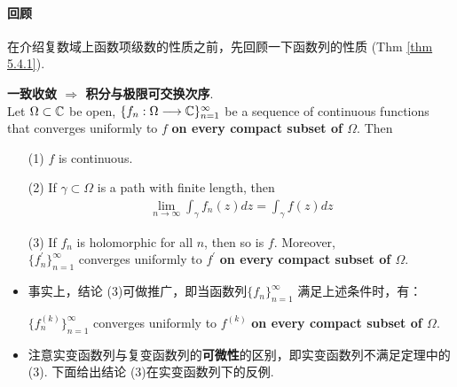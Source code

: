 \paragraph{回顾}
	在介绍复数域上函数项级数的性质之前，先回顾一下函数列的性质 (Thm \ref{thm 5.4.1}).
	\begin{thm}\label{thm 6.2.1}
		\textbf{一致收敛 $\Rightarrow$ 积分与极限可交换次序}.\\
		Let $\Omega \subset \mathbb{C}$ be open, $\{ f_n : \Omega \longrightarrow \mathbb{C} \}_{n = 1}^{\infty}$ be a sequence of continuous functions that converges uniformly to $f$ \textbf{on every compact subset of $\Omega$}. Then
		\begin{enumerate}
			\item[(1)]$f$ is continuous.
			
			\vspace{1em}
			
			\item[(2)]If $\gamma \subset \Omega$ is a path with finite length, then
			\begin{align}
				\lim_{n \to \infty}{\int_{\gamma}{f_{n}(z) dz}} = \int_{\gamma}{f(z) dz}
			\end{align}
			
			\vspace{1em}
			
			\item[(3)]If $f_n$ is holomorphic for all $n$, then so is $f$. Moreover, \\
			$\{ f_{n}^{'} \}_{n = 1}^{\infty}$ converges uniformly to $f^{'}$ \textbf{on every compact subset of $\Omega$}.
		\end{enumerate}
		
		\vspace{1em}
		\begin{rmk}
			\begin{itemize}
				\item 事实上，结论 (3)可做推广，即当函数列$\{ f_n \}_{n = 1}^{\infty}$ 满足上述条件时，有：
				\begin{center}
					$\{ f_{n}^{(k)} \}_{n = 1}^{\infty}$ converges uniformly to $f^{(k)}$ \textbf{on every compact subset of $\Omega$}.
				\end{center}
			
				\vspace{2em}
				
				\item 注意实变函数列与复变函数列的\textbf{可微性}的区别，即实变函数列不满足定理中的 (3). 下面给出结论 (3)在实变函数列下的反例.
				

\end{itemize}
\end{rmk}
\end{thm}
